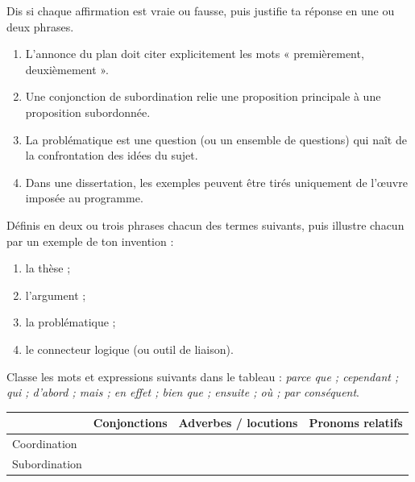 \documentclass[11pt]{article}
\newcommand{\cle}[1]{{\popxbold\color{popdark}#1}}
\newcounter{popsec}
\newcounter{popsub}
\newcommand{\courssub}[1]{%
  \stepcounter{popsub}%
  \par\vspace{9pt}\noindent{\popxbold\fontsize{11.5}{13}\selectfont\color{popink}{\color{poporange}\thepopsec.\thepopsub}\hspace{6pt}#1}\par\nopagebreak\vspace{4pt}
}
\begin{document}
\begin{exercice}
Dis si chaque affirmation est vraie ou fausse, puis justifie ta réponse en une ou deux phrases.
\begin{enumerate}
\item L'annonce du plan doit citer explicitement les mots « premièrement, deuxièmement ».
\item Une conjonction de subordination relie une proposition principale à une proposition subordonnée.
\item La problématique est une question (ou un ensemble de questions) qui naît de la confrontation des idées du sujet.
\item Dans une dissertation, les exemples peuvent être tirés uniquement de l'œuvre imposée au programme.
\end{enumerate}
\end{exercice}

\begin{exercice}[Définitions]
Définis en deux ou trois phrases chacun des termes suivants, puis illustre chacun par un exemple de ton invention :
\begin{enumerate}
\item la \cle{thèse} ;
\item l'\cle{argument} ;
\item la \cle{problématique} ;
\item le \cle{connecteur logique} (ou outil de liaison).
\end{enumerate}
\end{exercice}

\begin{exercice}
Classe les mots et expressions suivants dans le tableau : \emph{parce que ; cependant ; qui ; d'abord ; mais ; en effet ; bien que ; ensuite ; où ; par conséquent}.
\begin{center}
\begin{tabularx}{\linewidth}{|l|X|X|X|}\hline
\rowcolor{popblueL} & \textbf{Conjonctions} & \textbf{Adverbes / locutions} & \textbf{Pronoms relatifs} \\ \hline
Coordination & & & \\ \hline
Subordination & & & \\ \hline
\end{tabularx}
\end{center}
\end{exercice}

\courssub{Je m'entraîne}
\end{document}
